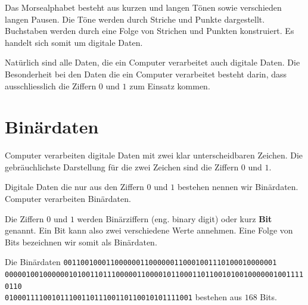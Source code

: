 \begin{example}
Das Morsealphabet besteht aus kurzen und langen Tönen sowie verschieden langen Pausen. Die Töne werden durch Striche und Punkte dargestellt. Buchstaben werden durch eine Folge von Strichen und Punkten konstruiert. Es handelt sich somit um digitale Daten.
\end{example}

Natürlich sind alle Daten, die ein Computer verarbeitet auch digitale Daten. Die Besonderheit bei den Daten die ein Computer verarbeitet besteht darin, dass ausschliesslich die Ziffern $0$ und $1$ zum Einsatz kommen.

\section{Binärdaten}

Computer verarbeiten digitale Daten mit zwei klar unterscheidbaren Zeichen. Die gebräuchlichste Darstellung für die zwei Zeichen sind die Ziffern $0$ und $1$.

\begin{definition}[Binärdaten]
Digitale Daten die nur aus den Ziffern $0$ und $1$ bestehen nennen wir Binärdaten. Computer verarbeiten Binärdaten.
\end{definition}

\begin{definition}[Binärziffer]
Die Ziffern $0$ und $1$ werden Binärziffern (eng. binary digit) oder kurz \textbf{Bit} genannt. Ein Bit kann also zwei verschiedene Werte annehmen. Eine Folge von Bits bezeichnen wir somit als Binärdaten.
\end{definition}

\begin{example}
Die Binärdaten \texttt{00110010001100000011000000110001001110100010000001} \\ \texttt{00000100100000010100110111000001100001011000110110010100100000010011110110} \\ \texttt{01000111100101110011011100110110010101111001} bestehen aus $168$ Bits.
\end{example}